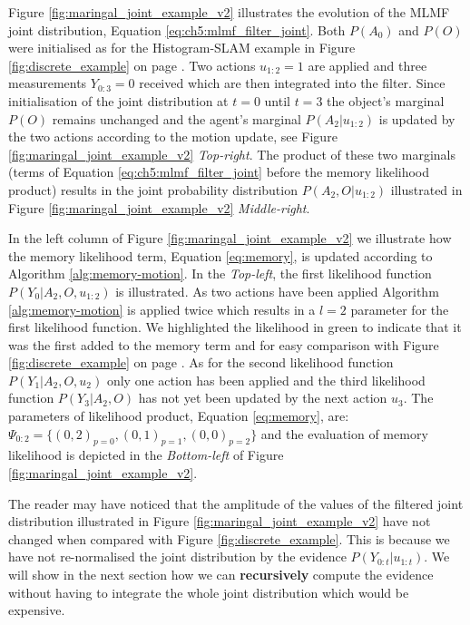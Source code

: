 Figure \ref{fig:maringal_joint_example_v2} illustrates the evolution of the MLMF joint distribution, Equation  \ref{eq:ch5:mlmf_filter_joint}.
Both $P(A_0)$ and $P(O)$ were initialised as for the Histogram-SLAM example in Figure \ref{fig:discrete_example} on page \pageref{fig:discrete_example}.
Two actions $u_{1:2}=1$ are applied and three measurements $Y_{0:3} = 0$ received which are then integrated into the filter. 
Since initialisation of the joint distribution at $t=0$ until $t=3$ the object's marginal $P(O)$ remains unchanged and the agent's 
marginal $P(A_2|u_{1:2})$ is updated by the two actions according to the motion update, see Figure \ref{fig:maringal_joint_example_v2} \textit{Top-right}.
The product of these two marginals (terms of Equation \ref{eq:ch5:mlmf_filter_joint} before the memory likelihood product) results in the joint
probability distribution $P(A_2,O|u_{1:2})$ illustrated in Figure \ref{fig:maringal_joint_example_v2} \textit{Middle-right}.

In the left column of Figure \ref{fig:maringal_joint_example_v2} we illustrate how the memory likelihood term, Equation \ref{eq:memory}, 
is updated according to Algorithm \ref{alg:memory-motion}. In the \textit{Top-left}, the first likelihood function $P(Y_0|A_2,O,u_{1:2})$ 
is illustrated. As two actions have been applied Algorithm \ref{alg:memory-motion} is applied twice which results in a $l=2$ parameter
for the first likelihood function. We highlighted the likelihood in green to indicate that it was the first added to the 
memory term and for easy comparison with Figure \ref{fig:discrete_example} on page \pageref{fig:discrete_example}. As for the second 
likelihood function $P(Y_1|A_2,O,u_{2})$ only one action has been applied and the third likelihood function $P(Y_3|A_2,O)$ has not yet
been updated by the next action $u_3$. The parameters of likelihood product, Equation \ref{eq:memory}, are: $\Psi_{0:2} = \{(0,2)_{p=0},(0,1)_{p=1},(0,0)_{p=2}\}$ and the evaluation of memory 
likelihood is depicted in the \textit{Bottom-left} of Figure \ref{fig:maringal_joint_example_v2}. 

The reader may have noticed that the amplitude of the values of the filtered joint distribution illustrated in Figure \ref{fig:maringal_joint_example_v2} have not changed
when compared with Figure \ref{fig:discrete_example}. This is because we have not re-normalised the joint distribution by the evidence $P(Y_{0:t}|u_{1:t})$. We will show 
in the next section how we can \textbf{recursively} compute the evidence without having to integrate the whole joint distribution which would be 
expensive.

